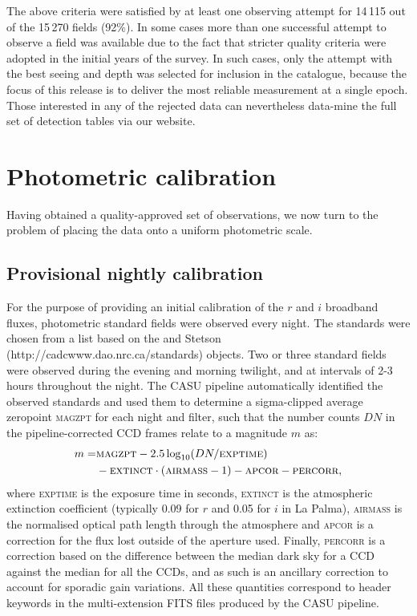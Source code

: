 \documentclass[useAMS,usenatbib]{mn2e}
\begin{document}
The above criteria were satisfied by at least one observing attempt
for 14\,115 out of the 15\,270 fields (92\%).
In some cases more than one successful attempt to observe
a field was available due to the fact that stricter
quality criteria were adopted in the initial years of the survey.
In such cases, only the attempt 
with the best seeing and depth was selected
for inclusion in the catalogue, because the focus 
of this release is to deliver the most reliable
measurement at a single epoch.
Those interested in any of the rejected data 
can nevertheless data-mine the full set of detection tables 
via our website.


\section{Photometric calibration}
\label{sec:calibration}

Having obtained a quality-approved set of observations,
we now turn to the problem of placing the data
onto a uniform photometric scale.

\subsection{Provisional nightly calibration}

For the purpose of providing an initial calibration 
of the $r$ and $i$ broadband fluxes,
photometric standard fields were observed every night.
The standards were chosen from a list based on 
the \cite{Landolt1992} and Stetson (http://cadcwww.dao.nrc.ca/standards) 
objects.
Two or three standard fields were observed 
during the evening and morning twilight,
and at intervals of 2-3 hours throughout the night.
The CASU pipeline automatically identified the observed standards 
and used them to determine a sigma-clipped average zeropoint \textsc{magzpt}
for each night and filter,
such that the number counts $DN$ 
in the pipeline-corrected CCD frames
relate to a magnitude $m$ as:
\begin{equation}
\begin{split}
   m  = & \textsc{magzpt} - 2.5 \log_{10}( DN / \textsc{exptime} ) \\
 &  - \textsc{extinct}\cdot(\textsc{airmass}-1) - \textsc{apcor} - \textsc{percorr},
\label{eqn:mag}
\end{split}
\end{equation}
where \textsc{exptime} is the exposure time in seconds,
\textsc{extinct} is the atmospheric extinction coefficient 
(typically 0.09 for $r$ and 0.05 for $i$ in La Palma),
\textsc{airmass} is the normalised optical path length 
through the atmosphere and
\textsc{apcor} is a correction for the flux
lost outside of the aperture used.
Finally, \textsc{percorr} is a correction based on the difference
between the median dark sky for a CCD against the median for all the CCDs, 
and as such is an ancillary correction 
to account for sporadic gain variations. 
All these quantities correspond to header keywords in the 
multi-extension FITS files produced by the CASU pipeline.
\end{document}
